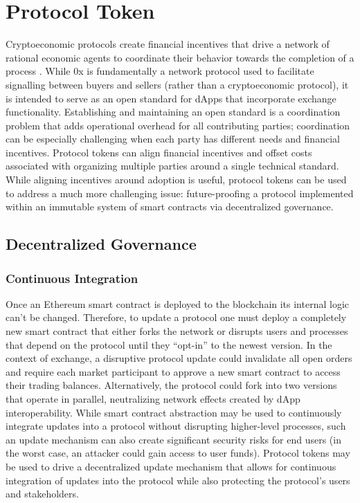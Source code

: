 \documentclass[10pt]{article}
\begin{document}
\section{Protocol Token}

Cryptoeconomic protocols create financial incentives that drive a network of rational economic agents to coordinate their behavior towards the completion of a process \cite{fe1,fe2,ww1}. While 0x is fundamentally a network protocol used to facilitate signalling between buyers and sellers (rather than a cryptoeconomic protocol), it is intended to serve as an open standard for dApps that incorporate exchange functionality. Establishing and maintaining an open standard is a coordination problem that adds operational overhead for all contributing parties; coordination can be especially challenging when each party has different needs and financial incentives. Protocol tokens can align financial incentives and offset costs associated with organizing multiple parties around a single technical standard. While aligning incentives around adoption is useful, protocol tokens can be used to address a much more challenging issue: future-proofing a protocol implemented within an immutable system of smart contracts via decentralized governance.

\subsection{Decentralized Governance}

\subsubsection{Continuous Integration}

\noindent  Once an Ethereum smart contract is deployed to the blockchain its internal logic can't be changed. Therefore, to update a protocol one must deploy a completely new smart contract that either forks the network or disrupts users and processes that depend on the protocol until they ``opt-in'' to the newest version. In the context of exchange, a disruptive protocol update could invalidate all open orders and require each market participant to approve a new smart contract to access their trading balances. Alternatively, the protocol could fork into two versions that operate in parallel, neutralizing network effects created by dApp interoperability. While smart contract abstraction may be used to continuously integrate updates into a protocol without disrupting higher-level processes, such an update mechanism can also create significant security risks for end users (in the worst case, an attacker could gain access to user funds). Protocol tokens may be used to drive a decentralized update mechanism that allows for continuous integration of updates into the protocol while also protecting the protocol's users and stakeholders. \\
\end{document}
